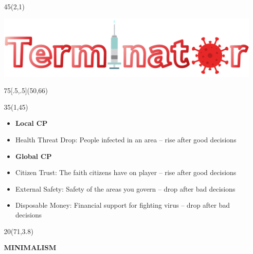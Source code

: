 \documentclass[hyperref={pdfpagelabels=false}]{beamer}
\newcommand{\clock}[3]{%
		\begin{scope}[scale=14]
			\shadedraw [inner color=#1!30!white, outer color=#1!90!black, line width=12pt] (0,0) circle (1cm); 
			\foreach \angle in {0, 30, ..., 330} 
			\draw[line width=2pt] (\angle:0.82cm) -- (\angle:1cm);
			\foreach \angle in {0,90,180,270}
			\draw[line width=4pt] (\angle:0.75cm) -- (\angle:1cm);
			\draw[line width=8pt] (0,0) -- (90-270*#3:0.4cm);  
			\draw[line width=8pt] (0,0) -- (90-240*#3:0.6cm);  
		\end{scope}
	}
\begin{document}
\begin{frame}

	\begin{textblock}{45}(2,1)
		\begin{blankbox}
			\includegraphics[width=1000pt]{img/gamename.png}
		\end{blankbox}
	\end{textblock}


	\begin{textblock}{75}[.5,.5](50,66)
		\centering
\end{textblock}

\begin{textblock}{35}(1,45)
		\begin{blankbox}

			\begin{itemize}
							\item \textbf {Local CP}
							\item Health Threat Drop: People infected in an area -- rise after good decisions
							\item \textbf {Global CP}
							\item Citizen Trust: The faith citizens have on player -- rise after good decisions
							\item External Safety: Safety of the areas you govern -- drop after bad decisions
							\item Disposable Money: Financial support for fighting virus -- drop after bad decisions
						\end{itemize}
			
		\end{blankbox}
	\end{textblock}



	\begin{textblock}{20}(71,3.8)
		\begin{blankbox}
			\Huge\textbf{MINIMALISM}


\end{blankbox}
\end{textblock}
\end{frame}
\end{document}
